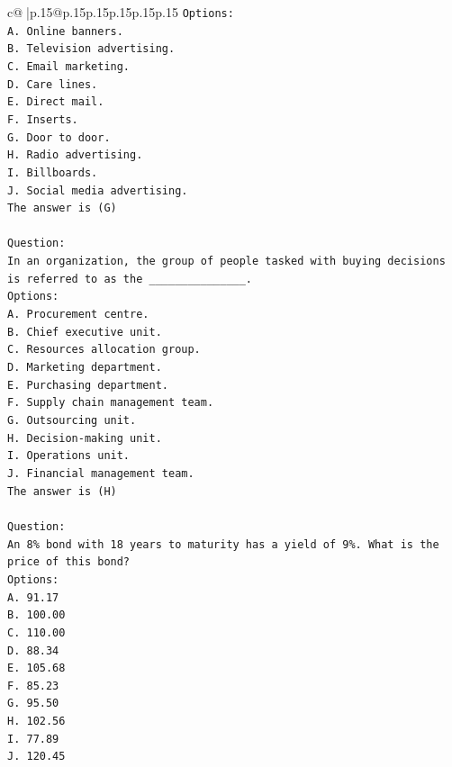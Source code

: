 \documentclass{article}
\begin{document}
{\begin{supertabular}{c@{$\;$}|p{.15\linewidth}@{}p{.15\linewidth}p{.15\linewidth}p{.15\linewidth}p{.15\linewidth}p{.15\linewidth}}
{{{\texttt{Options:} \\
\texttt{A. Online banners.} \\
\texttt{B. Television advertising.} \\
\texttt{C. Email marketing.} \\
\texttt{D. Care lines.} \\
\texttt{E. Direct mail.} \\
\texttt{F. Inserts.} \\
\texttt{G. Door to door.} \\
\texttt{H. Radio advertising.} \\
\texttt{I. Billboards.} \\
\texttt{J. Social media advertising.} \\
\texttt{The answer is (G)} \\
\\ 
\texttt{Question:} \\
\texttt{In an organization, the group of people tasked with buying decisions is referred to as the \_\_\_\_\_\_\_\_\_\_\_\_\_\_\_.} \\
\texttt{Options:} \\
\texttt{A. Procurement centre.} \\
\texttt{B. Chief executive unit.} \\
\texttt{C. Resources allocation group.} \\
\texttt{D. Marketing department.} \\
\texttt{E. Purchasing department.} \\
\texttt{F. Supply chain management team.} \\
\texttt{G. Outsourcing unit.} \\
\texttt{H. Decision{-}making unit.} \\
\texttt{I. Operations unit.} \\
\texttt{J. Financial management team.} \\
\texttt{The answer is (H)} \\
\\ 
\texttt{Question:} \\
\texttt{An 8\% bond with 18 years to maturity has a yield of 9\%. What is the price of this bond?} \\
\texttt{Options:} \\
\texttt{A. 91.17} \\
\texttt{B. 100.00} \\
\texttt{C. 110.00} \\
\texttt{D. 88.34} \\
\texttt{E. 105.68} \\
\texttt{F. 85.23} \\
\texttt{G. 95.50} \\
\texttt{H. 102.56} \\
\texttt{I. 77.89} \\
\texttt{J. 120.45} \\
            }
        }
    }
     \\ \\


\end{supertabular}}
\end{document}
